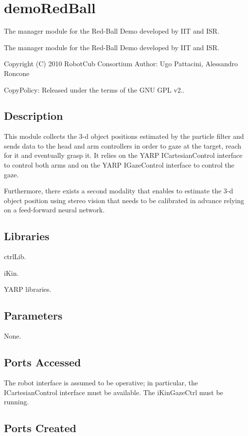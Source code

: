 \section{demo\+Red\+Ball}
\label{group__src__demoRedBall}


The manager module for the Red-\/\+Ball Demo developed by I\+IT and I\+SR.  


The manager module for the Red-\/\+Ball Demo developed by I\+IT and I\+SR. 

Copyright (C) 2010 Robot\+Cub Consortium Author\+: Ugo Pattacini, Alessandro Roncone

Copy\+Policy\+: Released under the terms of the G\+NU G\+PL v2..\hypertarget{group__src__demoYoga_intro_sec}{}\subsection{Description}\label{group__src__demoYoga_intro_sec}
This module collects the 3-\/d object positions estimated by the particle filter and sends data to the head and arm controllers in order to gaze at the target, reach for it and eventually grasp it. It relies on the Y\+A\+RP I\+Cartesian\+Control interface to control both arms and on the Y\+A\+RP I\+Gaze\+Control interface to control the gaze.

Furthermore, there exists a second modality that enables to estimate the 3-\/d object position using stereo vision that needs to be calibrated in advance relying on a feed-\/forward neural network.\hypertarget{group__src__demoYoga_lib_sec}{}\subsection{Libraries}\label{group__src__demoYoga_lib_sec}

\begin{DoxyItemize}
\item ctrl\+Lib.
\item i\+Kin.
\item Y\+A\+RP libraries.
\end{DoxyItemize}\hypertarget{group__src__demoYoga_parameters_sec}{}\subsection{Parameters}\label{group__src__demoYoga_parameters_sec}
None.\hypertarget{group__src__demoYoga_portsa_sec}{}\subsection{Ports Accessed}\label{group__src__demoYoga_portsa_sec}
The robot interface is assumed to be operative; in particular, the I\+Cartesian\+Control interface must be available. The i\+Kin\+Gaze\+Ctrl must be running. \hypertarget{group__src__demoYoga_portsc_sec}{}\subsection{Ports Created}\label{group__src__demoYoga_portsc_sec}

